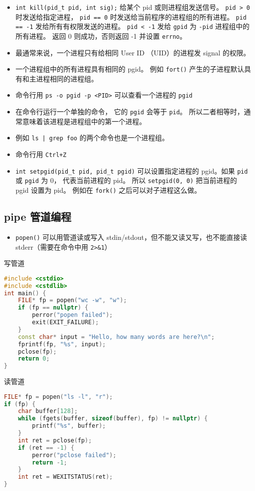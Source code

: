 \begin{itemize}
\item \verb`int kill(pid_t pid, int sig);` 给某个 pid 或则进程组发送信号。 \verb`pid > 0` 时发送给指定进程， \verb`pid == 0` 时发送给当前程序的进程组的所有进程。 \verb`pid == -1` 发给所有有权限发送的进程。 \verb`pid < -1` 发给 \verb`gpid` 为 \verb`-pid` 进程组中的所有进程。 返回 0 则成功，否则返回 -1 并设置 \verb`errno`。
\item 最通常来说，一个进程只有给相同 User ID （UID）的进程发 signal 的权限。
\item 一个进程组中的所有进程具有相同的 pgid。 例如 \verb`fort()` 产生的子进程默认具有和主进程相同的进程组。
\item 命令行用 \verb`ps -o pgid -p <PID>` 可以查看一个进程的 \verb`pgid`
\item 在命令行运行一个单独的命令， 它的 \verb`pgid` 会等于 \verb`pid`。 所以二者相等时，通常意味着该进程是进程组中的第一个进程。
\item 例如 \verb`ls | grep foo` 的两个命令也是一个进程组。
\item 命令行用 \verb`Ctrl+Z`
\item \verb`int setpgid(pid_t pid, pid_t pgid)` 可以设置指定进程的 pgid。如果 \verb`pid` 或 \verb`pgid` 为 0， 代表当前进程的 pid。 所以 \verb`setpgid(0, 0)` 把当前进程的 pgid 设置为 pid。 例如在 \verb`fork()` 之后可以对子进程这么做。
\end{itemize}

\subsection{pipe 管道编程}
\begin{itemize}
\item \verb`popen()` 可以用管道读或写入 stdin/stdout，但不能又读又写，也不能直接读 stderr（需要在命令中用 \verb`2>&1`）
\end{itemize}

写管道
\begin{lstlisting}[language=cpp]
#include <cstdio>
#include <cstdlib>
int main() {
    FILE* fp = popen("wc -w", "w");
    if (fp == nullptr) {
        perror("popen failed");
        exit(EXIT_FAILURE);
    }
    const char* input = "Hello, how many words are here?\n";
    fprintf(fp, "%s", input);
    pclose(fp);
    return 0;
}
\end{lstlisting}
读管道
\begin{lstlisting}[language=cpp]
FILE* fp = popen("ls -l", "r");
if (fp) {
    char buffer[128];
    while (fgets(buffer, sizeof(buffer), fp) != nullptr) {
        printf("%s", buffer);
    }
    int ret = pclose(fp);
    if (ret == -1) {
        perror("pclose failed");
        return -1;
    }
    int ret = WEXITSTATUS(ret);
}
\end{lstlisting}

